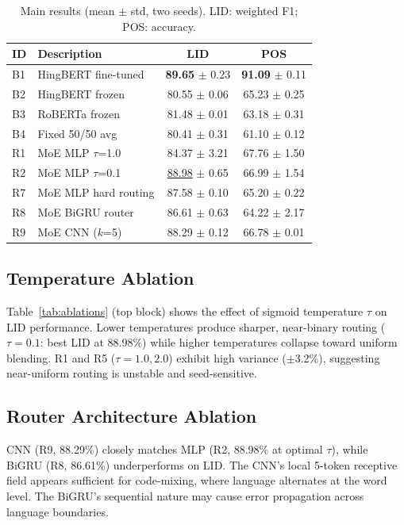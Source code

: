\documentclass[conference]{IEEEtran}
\begin{document}
\begin{table}[t]
\centering
\caption{Main results (mean $\pm$ std, two seeds). LID: weighted F1; POS: accuracy.}
\label{tab:main}
\setlength{\tabcolsep}{4pt}
\begin{tabular}{llcc}
\toprule
\textbf{ID} & \textbf{Description} & \textbf{LID} & \textbf{POS} \\
\midrule
B1 & HingBERT fine-tuned     & \textbf{89.65} $\pm$ 0.23 & \textbf{91.09} $\pm$ 0.11 \\
B2 & HingBERT frozen          & 80.55 $\pm$ 0.06          & 65.23 $\pm$ 0.25 \\
B3 & RoBERTa frozen           & 81.48 $\pm$ 0.01          & 63.18 $\pm$ 0.31 \\
B4 & Fixed 50/50 avg          & 80.41 $\pm$ 0.31          & 61.10 $\pm$ 0.12 \\
\midrule
R1 & MoE MLP $\tau$=1.0       & 84.37 $\pm$ 3.21          & 67.76 $\pm$ 1.50 \\
R2 & MoE MLP $\tau$=0.1       & \underline{88.98} $\pm$ 0.65 & 66.99 $\pm$ 1.54 \\
R7 & MoE MLP hard routing     & 87.58 $\pm$ 0.10          & 65.20 $\pm$ 0.22 \\
R8 & MoE BiGRU router         & 86.61 $\pm$ 0.63          & 64.22 $\pm$ 2.17 \\
R9 & MoE CNN ($k$=5)          & 88.29 $\pm$ 0.12          & 66.78 $\pm$ 0.01 \\
\bottomrule
\end{tabular}
\end{table}

\subsection{Temperature Ablation}

Table~\ref{tab:ablations} (top block) shows the effect of sigmoid temperature $\tau$ on LID performance. Lower temperatures produce sharper, near-binary routing ($\tau{=}0.1$: best LID at 88.98\%) while higher temperatures collapse toward uniform blending. R1 and R5 ($\tau{=}1.0, 2.0$) exhibit high variance ($\pm$3.2\%), suggesting near-uniform routing is unstable and seed-sensitive.

\subsection{Router Architecture Ablation}

CNN (R9, 88.29\%) closely matches MLP (R2, 88.98\% at optimal $\tau$), while BiGRU (R8, 86.61\%) underperforms on LID. The CNN's local 5-token receptive field appears sufficient for code-mixing, where language alternates at the word level. The BiGRU's sequential nature may cause error propagation across language boundaries.
\end{document}
